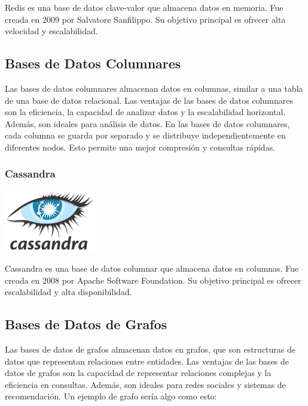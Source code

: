 \documentclass[12pt]{article}
\begin{document}
Redis es una base de datos clave-valor que almacena datos en memoria. Fue creada en 2009 por Salvatore Sanfilippo. Su objetivo principal es ofrecer alta velocidad y escalabilidad.

\subsection{Bases de Datos Columnares}

Las bases de datos columnares almacenan datos en columnas, similar a una tabla de una base de datos relacional. Las ventajas de las bases de datos columnares son la eficiencia, la capacidad de analizar datos y la escalabilidad horizontal. Además, son ideales para análisis de datos. En las bases de datos columnares, cada columna se guarda por separado y se distribuye independientemente en diferentes nodos. Esto permite una mejor compresión y consultas rápidas.

\subsubsection{Cassandra}

\begin{center}
  \includegraphics[width=0.3\textwidth]{images/Cassandra.png}
\end{center}

Cassandra es una base de datos columnar que almacena datos en columnas. Fue creada en 2008 por Apache Software Foundation. Su objetivo principal es ofrecer escalabilidad y alta disponibilidad.

\subsection{Bases de Datos de Grafos}

Las bases de datos de grafos almacenan datos en grafos, que son estructuras de datos que representan relaciones entre entidades. Las ventajas de las bases de datos de grafos son la capacidad de representar relaciones complejas y la eficiencia en consultas. Además, son ideales para redes sociales y sistemas de recomendación. Un ejemplo de grafo sería algo como esto:

\vspace{1em}
\end{document}
